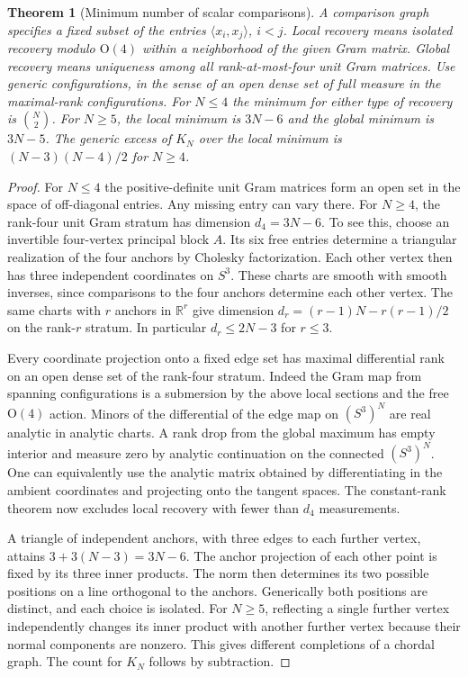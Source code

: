 \documentclass[11pt,reqno]{amsart}
\newtheorem{theorem}{Theorem}[section]
\theoremstyle{definition}
\theoremstyle{remark}
\numberwithin{equation}{section}
\begin{document}
\begin{theorem}[Minimum number of scalar comparisons]\label{m8:counts}
A comparison graph specifies a fixed subset of the entries
$\langle x_i,x_j\rangle$, $i<j$. Local recovery means isolated
recovery modulo $\mathrm O(4)$ within a neighborhood of the given
Gram matrix. Global recovery means uniqueness among all rank-at-most-four
unit Gram matrices. Use generic configurations, in the sense of an
open dense set of full measure in the maximal-rank configurations.
For $N\le4$ the minimum for either type of recovery is
$\binom N2$. For $N\ge5$, the local minimum is $3N-6$ and the
global minimum is $3N-5$. The generic excess of $K_N$ over the
local minimum is $(N-3)(N-4)/2$ for $N\ge4$.
\end{theorem}
\begin{proof}
For $N\le4$ the positive-definite unit Gram matrices form an open
set in the space of off-diagonal entries. Any missing entry can
vary there. For $N\ge4$, the rank-four unit Gram stratum has
dimension $d_4=3N-6$. To see this, choose an invertible four-vertex
principal block $A$. Its six free entries determine a triangular
realization of the four anchors by Cholesky factorization. Each
other vertex then has three independent coordinates on $S^3$.
These charts are smooth with smooth inverses, since comparisons
to the four anchors determine each other vertex. The same charts
with $r$ anchors in $\mathbb R^r$ give dimension
$d_r=(r-1)N-r(r-1)/2$ on the rank-$r$ stratum. In particular
$d_r\le2N-3$ for $r\le3$.

Every coordinate projection onto a fixed edge set has maximal
differential rank on an open dense set of the rank-four stratum.
Indeed the Gram map from spanning configurations is a submersion
by the above local sections and the free $\mathrm O(4)$ action.
Minors of the differential of the edge map on $(S^3)^N$ are
real analytic in analytic charts. A rank drop from the global
maximum has empty interior and measure zero by analytic
continuation on the connected $(S^3)^N$. One can equivalently use
the analytic matrix obtained by differentiating in the ambient
coordinates and projecting onto the tangent spaces. The constant-rank
theorem now excludes local recovery with fewer than $d_4$ measurements.

A triangle of independent anchors, with three edges to each further
vertex, attains $3+3(N-3)=3N-6$. The anchor projection of each other
point is fixed by its three inner products. The norm then determines
its two possible positions on a line orthogonal to the anchors.
Generically both positions are distinct, and each choice is
isolated. For $N\ge5$, reflecting a single further vertex independently
changes its inner product with another further vertex because their
normal components are nonzero. This gives different completions
of a chordal graph. The count for $K_N$ follows by subtraction.


\end{proof}
\end{document}
